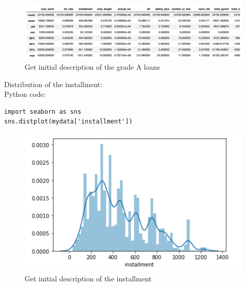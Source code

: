 \documentclass{article}
\begin{document}
\begin{enumerate}[(a)]
\begin{figure}[h!]
    \centering
    \includegraphics[scale=0.50]{despA}
    \caption{Get initial description of the grade A loans}
    \label{fig:original fico_hist}
    \end{figure}

Distribution of the installment:\\
 Python code:
 \begin{verbatim}
import seaborn as sns
sns.distplot(mydata['installment'])
\end{verbatim}

\begin{figure}[h!]
    \centering
    \includegraphics[scale=0.50]{install}
    \caption{Get initial description of the installment}
    \label{fig:original fico_hist}
    \end{figure}
    
 \newpage
    

\end{enumerate}
\end{document}
